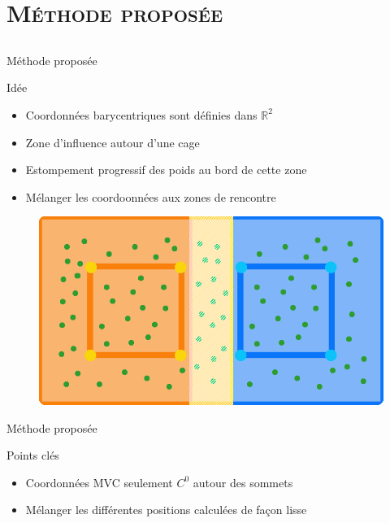 \documentclass[xcolor=x11names,compress]{beamer}
\renewcommand{\(}{\begin{columns}} \renewcommand{\)}{\end{columns}}
\newcommand{\<}[1]{\begin{column}{#1}} \renewcommand{\>}{\end{column}}
\begin{document}
\section{\scshape Méthode proposée}
\subsection{}

\begin{frame}{Méthode proposée}
  \begin{block}{Idée}
    \begin{itemize}
    \item Coordonnées barycentriques sont définies dans $\mathbb{R}^2$
    \item Zone d'influence autour d'une cage
    \item Estompement progressif des poids au bord de cette zone
    \item Mélanger les coordoonnées aux zones de rencontre
    \end{itemize}
  \end{block}
\begin{figure}[h]
\includegraphics[scale=0.2]{bordure-cage}
\end{figure}
\end{frame}

\begin{frame}{Méthode proposée}
  \begin{alertblock}{Points clés}
    \begin{itemize}
    \item Coordonnées MVC seulement $C^0$ autour des sommets
    \item Mélanger les différentes positions calculées de façon lisse
    \end{itemize}
  \end{alertblock}
\end{frame}
\end{document}
